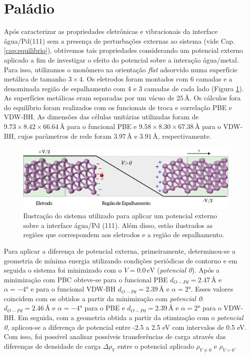 	
\section{Paládio\label{sec:pd_negf}}

Após caracterizar as propriedades eletrônicas e vibracionais da interface água/Pd(111) sem a presença de perturbações externas ao sistema (vide Cap. \ref{cap:equilibrio}), obtivemos tais propriedades considerando um potencial externo aplicado a fim de investigar o efeito do potencial sobre a interação água/metal. Para isso, utilizamos o monômero na orientação \textit{flat} adsorvido numa superfície metálica de tamanho $ 3\times4 $. Os eletrodos foram montados com 6 camadas e a denominada região de espalhamento com 4 e 3 camadas de cada lado (Figura \ref{fig:sistema_pd}). As superfícies metálicas eram separadas por um vácuo de $ 25\,\si{\angstrom} $. Os cálculos fora do equilíbrio foram realizados com os funcionais de troca e correlação PBE e VDW-BH. As dimensões das células unitárias utilizadas foram de $ 9.73\times8.42\times66.64\,\si{\angstrom} $ para o funcional PBE e $ 9.58\times8.30\times 67.38\,\si{\angstrom} $ para o VDW-BH, cujos parâmetros de rede foram $ 3.97\,\si{\angstrom} $ e $ 3.91\,\si{\angstrom} $, respectivamente.
\begin{figure}[H]
	\centering
	\caption{Ilustração do sistema utilizado para aplicar um potencial externo sobre a interface água/Pd (111). Além disso, estão ilustrados as regiões que correspondem aos eletrodos e a região de espalhamento.}
\label{fig:sistema_pd}
	\includegraphics[scale=0.35]{figs/sistema_pd.png}
\end{figure}

Para aplicar a diferença de potencial externa, primeiramente, determinou-se a geometria de mínima energia utilizando condições periódicas de contorno e em seguida o sistema foi minimizado com o $ V=0.0\,\si{\eV} $ (\textit{potencial 0}). Após a minimização com PBC obteve-se para o funcional PBE $d_{O-Pd}=2.47\,\si{\angstrom} $ e $ \alpha=-4\si{\degree} $ e para o funcional VDW-BH $d_{O-Pd}=2.39\,\si{\angstrom} $ e $ \alpha=2\si{\degree} $. Esses valores coincidem com os obtidos a partir da minimização com \textit{potencial 0}: $d_{O-Pd}=2.46\,\si{\angstrom} $ e $ \alpha=-4\si{\degree} $ para o PBE e $d_{O-Pd}=2.39\,\si{\angstrom} $ e $ \alpha=2\si{\degree} $ para o VDW-BH. Em seguida, com a geometria obtida a partir da otimização com o \textit{potencial 0}, aplicou-se a diferença de potencial entre -2.5 a 2.5 eV com intervalos de 0.5 eV. Com isso, foi possível analisar possíveis transferências de carga através das diferenças de densidade de carga $ \Delta\rho_{V} $ entre o potencial aplicado $ \rho_{V\neq0} $ e $ \rho_{V=0} $. %

